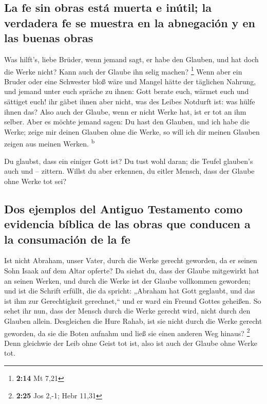 \hypertarget{la-fe-sin-obras-estuxe1-muerta-e-inuxfatil-la-verdadera-fe-se-muestra-en-la-abnegaciuxf3n-y-en-las-buenas-obras}{%
\subsection{La fe sin obras está muerta e inútil; la verdadera fe se
muestra en la abnegación y en las buenas
obras}\label{la-fe-sin-obras-estuxe1-muerta-e-inuxfatil-la-verdadera-fe-se-muestra-en-la-abnegaciuxf3n-y-en-las-buenas-obras}}

 Was hilft's, liebe Brüder, wenn jemand sagt, er habe den
Glauben, und hat doch die Werke nicht? Kann auch der Glaube ihn selig
machen? \footnote{\textbf{2:14} Mt 7,21}  Wenn aber ein
Bruder oder eine Schwester bloß wäre und Mangel hätte der täglichen
Nahrung,  und jemand unter euch spräche zu ihnen: Gott
berate euch, wärmet euch und sättiget euch! ihr gäbet ihnen aber nicht,
was des Leibes Notdurft ist: was hülfe ihnen das?  Also
auch der Glaube, wenn er nicht Werke hat, ist er tot an ihm selber.
 Aber es möchte jemand sagen: Du hast den Glauben, und
ich habe die Werke; zeige mir deinen Glauben ohne die Werke, so will ich
dir meinen Glauben zeigen aus meinen Werken. \textsuperscript{b}

 Du glaubst, dass ein einiger Gott ist? Du tust wohl
daran; die Teufel glauben's auch und -- zittern.  Willst
du aber erkennen, du eitler Mensch, dass der Glaube ohne Werke tot sei?

\hypertarget{dos-ejemplos-del-antiguo-testamento-como-evidencia-buxedblica-de-las-obras-que-conducen-a-la-consumaciuxf3n-de-la-fe}{%
\subsection{Dos ejemplos del Antiguo Testamento como evidencia bíblica
de las obras que conducen a la consumación de la
fe}\label{dos-ejemplos-del-antiguo-testamento-como-evidencia-buxedblica-de-las-obras-que-conducen-a-la-consumaciuxf3n-de-la-fe}}

 Ist nicht Abraham, unser Vater, durch die Werke gerecht
geworden, da er seinen Sohn Isaak auf dem Altar opferte? 
Da siehst du, dass der Glaube mitgewirkt hat an seinen Werken, und durch
die Werke ist der Glaube vollkommen geworden;  und ist
die Schrift erfüllt, die da spricht: „Abraham hat Gott geglaubt, und das
ist ihm zur Gerechtigkeit gerechnet,`` und er ward ein Freund Gottes
geheißen.  So sehet ihr nun, dass der Mensch durch die
Werke gerecht wird, nicht durch den Glauben allein. 
Desgleichen die Hure Rahab, ist sie nicht durch die Werke gerecht
geworden, da sie die Boten aufnahm und ließ sie einen anderen Weg
hinaus? \footnote{\textbf{2:25} Jos 2,-1; Hebr 11,31} 
Denn gleichwie der Leib ohne Geist tot ist, also ist auch der Glaube
ohne Werke tot.

